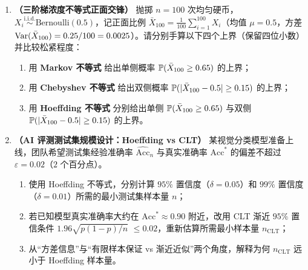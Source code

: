 \begin{enumerate}[label=\textbf{3.\arabic*}, leftmargin=2.4em, resume]
  \item \textbf{（三阶梯浓度不等式正面交锋）} 抛掷 $n = 100$ 次均匀硬币，$X_i \stackrel{\text{i.i.d.}}{\sim} \mathrm{Bernoulli}(0.5)$，记正面比例 $\bar{X}_{100} = \frac{1}{100}\sum_{i=1}^{100} X_i$（均值 $\mu = 0.5$，方差 $\operatorname{Var}(\bar{X}_{100}) = 0.25/100 = 0.0025$）。请分别手算以下四个上界（保留四位小数）并比较松紧程度：
  \begin{enumerate}[label=(\arabic*), leftmargin=1.8em]
    \item 用 \textbf{Markov 不等式} 给出单侧概率 $\mathbb{P}(\bar{X}_{100} \ge 0.65)$ 的上界；
    \item 用 \textbf{Chebyshev 不等式} 给出双侧概率 $\mathbb{P}(|\bar{X}_{100} - 0.5| \ge 0.15)$ 的上界；
    \item 用 \textbf{Hoeffding 不等式} 分别给出单侧 $\mathbb{P}(\bar{X}_{100} \ge 0.65)$ 与双侧 $\mathbb{P}(|\bar{X}_{100} - 0.5| \ge 0.15)$ 的上界。
  \end{enumerate}

  \item \textbf{（AI 评测测试集规模设计：Hoeffding vs CLT）} 某视觉分类模型准备上线，团队希望测试集经验准确率 $\widehat{\mathrm{Acc}}_n$ 与真实准确率 $\mathrm{Acc}^*$ 的偏差不超过 $\varepsilon = 0.02$（$2$ 个百分点）。
  \begin{enumerate}[label=(\arabic*), leftmargin=1.8em]
    \item 使用 Hoeffding 不等式，分别计算 $95\%$ 置信度（$\delta = 0.05$）和 $99\%$ 置信度（$\delta = 0.01$）所需的最小测试集样本量 $n$；
    \item 若已知模型真实准确率大约在 $\mathrm{Acc}^* \approx 0.90$ 附近，改用 CLT 渐近 $95\%$ 置信条件 $1.96\sqrt{p(1-p)/n}$ $\le 0.02$，重新估算所需最小样本量 $n_{\mathrm{CLT}}$；
    \item 从“方差信息”与“有限样本保证 vs 渐近近似”两个角度，解释为何 $n_{\mathrm{CLT}}$ 远小于 Hoeffding 样本量。
  \end{enumerate}
\end{enumerate}



